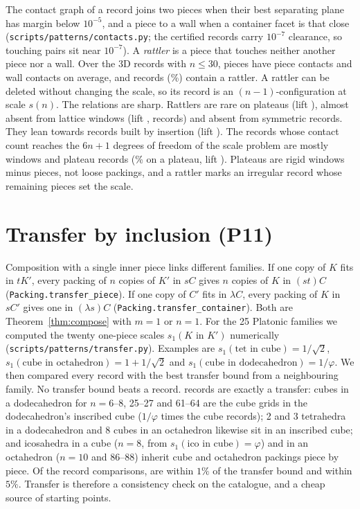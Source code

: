 \documentclass[11pt,a4paper]{article}
\newcommand{\code}[1]{\texttt{\nolinkurl{#1}}}
\newcommand{\lean}[1]{\texttt{#1}}
\theoremstyle{definition}
\theoremstyle{remark}
\begin{document}
The contact graph of a record joins two pieces when their best separating plane has margin below $10^{-5}$, and a piece to a wall when a container facet is that close (\code{scripts/patterns/contacts.py}; the certified records carry $10^{-7}$ clearance, so touching pairs sit near $10^{-7}$). A \emph{rattler} is a piece that touches neither another piece nor a wall. Over the \nCon{} 3D records with $n\le30$, pieces have \meanCoord{} piece contacts and \meanWall{} wall contacts on average, and \nConRattler{} records (\pctConRattler\%) contain a rattler. A rattler can be deleted without changing the scale, so its record is an $(n-1)$-configuration at scale $s(n)$. The relations are sharp. Rattlers are rare on plateaus (lift \liftRatPla{}), almost absent from lattice windows (lift \liftRatWin{}, \nRatWin{} records) and absent from symmetric records. They lean towards records built by insertion (lift \liftRatIns{}). The \nConIso{} records whose contact count reaches the $6n+1$ degrees of freedom of the scale problem are mostly windows and plateau records (\pIsoPla\% on a plateau, lift \liftIsoPla{}). Plateaus are rigid windows minus pieces, not loose packings, and a rattler marks an irregular record whose remaining pieces set the scale.

\section{Transfer by inclusion (P11)}\label{sec:transfer}

Composition with a single inner piece links different families. If one copy of $K$ fits in $tK'$, every packing of $n$ copies of $K'$ in $sC$ gives $n$ copies of $K$ in $(st)C$ (\lean{Packing.transfer\_piece}). If one copy of $C'$ fits in $\lambda C$, every packing of $K$ in $sC'$ gives one in $(\lambda s)C$ (\lean{Packing.transfer\_container}). Both are Theorem~\ref{thm:compose} with $m=1$ or $n=1$. For the 25 Platonic families we computed the twenty one-piece scales $s_1(K\text{ in }K')$ numerically (\code{scripts/patterns/transfer.py}). Examples are $s_1(\text{tet in cube})=1/\sqrt2$, $s_1(\text{cube in octahedron})=1+1/\sqrt2$ and $s_1(\text{cube in dodecahedron})=1/\varphi$. We then compared every record with the best transfer bound from a neighbouring family. No transfer bound beats a record. \nTrMatch{} records are exactly a transfer: cubes in a dodecahedron for $n=6$--8, 25--27 and 61--64 are the cube grids in the dodecahedron's inscribed cube ($1/\varphi$ times the cube records); 2 and 3 tetrahedra in a dodecahedron and 8 cubes in an octahedron likewise sit in an inscribed cube; and icosahedra in a cube ($n=8$, from $s_1(\text{ico in cube})=\varphi$) and in an octahedron ($n=10$ and 86--88) inherit cube and octahedron packings piece by piece. Of the \nTrAll{} record comparisons, \nTrOne{} are within $1\%$ of the transfer bound and \nTrFive{} within $5\%$. Transfer is therefore a consistency check on the catalogue, and a cheap source of starting points.
\end{document}
